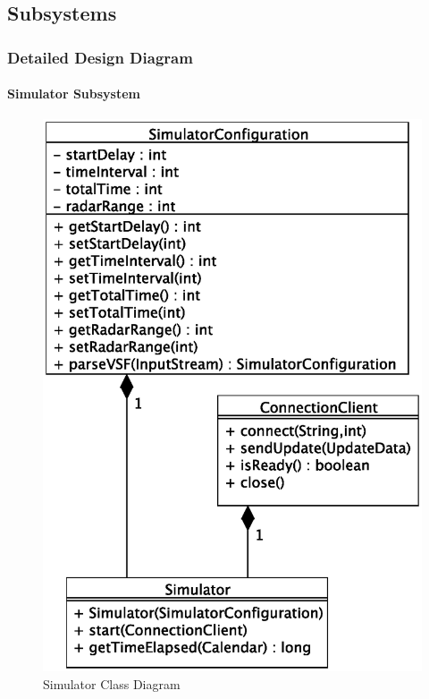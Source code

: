 \documentclass{article}
\begin{document}
\subsection{Subsystems} %

\subsubsection{Detailed Design Diagram} %

\paragraph{Simulator Subsystem} 

\begin{figure}[!htb]
\caption{Simulator Class Diagram}
\centering
\includegraphics[scale=0.6]{diagrams/simulator-class-diagram.eps}
\end{figure}
\end{document}
